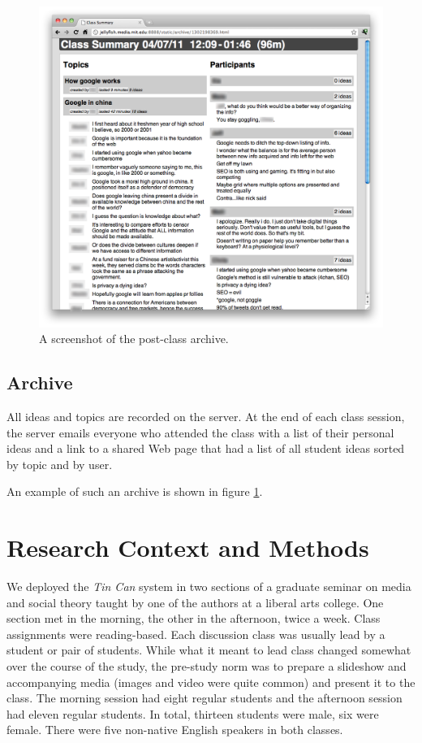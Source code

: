 \begin{figure}[p]
\centering
\includegraphics{figures/tincan/archive.png}
\caption{A screenshot of the post-class archive.}
\label{f:archive}
\end{figure}


\subsection{Archive}
All ideas and topics are recorded on the server. At the end of each class session, the server emails everyone who attended the class with a list of their personal ideas and a link to a shared Web page that had a list of all student ideas sorted by topic and by user.

An example of such an archive is shown in figure \ref{f:archive}.




\section{Research Context and Methods}
We deployed the \emph{Tin Can} system in two sections of a graduate seminar on media and social theory taught by one of the authors at a liberal arts college. One section met in the morning, the other in the afternoon, twice a week. Class assignments were reading-based. Each discussion class was usually lead by a student or pair of students. While what it meant to lead class changed somewhat over the course of the study, the pre-study norm was to prepare a slideshow and accompanying media (images and video were quite common) and present it to the class. The morning session had eight regular students and the afternoon session had eleven regular students. In total, thirteen students were male, six were female. There were five non-native English speakers in both classes. 

